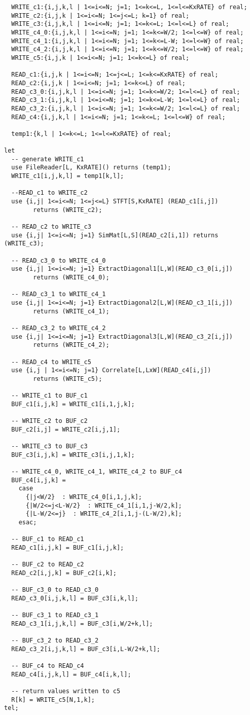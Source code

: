 \begin{verbatim}
  WRITE_c1:{i,j,k,l | 1<=i<=N; j=1; 1<=k<=L, 1<=l<=KxRATE} of real;
  WRITE_c2:{i,j,k | 1<=i<=N; 1<=j<=L; k=1} of real;
  WRITE_c3:{i,j,k,l | 1<=i<=N; j=1; 1<=k<=L; 1<=l<=L} of real;
  WRITE_c4_0:{i,j,k,l | 1<=i<=N; j=1; 1<=k<=W/2; 1<=l<=W} of real;
  WRITE_c4_1:{i,j,k,l | 1<=i<=N; j=1; 1<=k<=L-W; 1<=l<=W} of real;
  WRITE_c4_2:{i,j,k,l | 1<=i<=N; j=1; 1<=k<=W/2; 1<=l<=W} of real;
  WRITE_c5:{i,j,k | 1<=i<=N; j=1; 1<=k<=L} of real;

  READ_c1:{i,j,k | 1<=i<=N; 1<=j<=L; 1<=k<=KxRATE} of real;
  READ_c2:{i,j,k | 1<=i<=N; j=1; 1<=k<=L} of real;
  READ_c3_0:{i,j,k,l | 1<=i<=N; j=1; 1<=k<=W/2; 1<=l<=L} of real;
  READ_c3_1:{i,j,k,l | 1<=i<=N; j=1; 1<=k<=L-W; 1<=l<=L} of real;
  READ_c3_2:{i,j,k,l | 1<=i<=N; j=1; 1<=k<=W/2; 1<=l<=L} of real;
  READ_c4:{i,j,k,l | 1<=i<=N; j=1; 1<=k<=L; 1<=l<=W} of real;

  temp1:{k,l | 1<=k<=L; 1<=l<=KxRATE} of real;

let
  -- generate WRITE_c1
  use FileReader[L, KxRATE]() returns (temp1);
  WRITE_c1[i,j,k,l] = temp1[k,l];

  --READ_c1 to WRITE_c2
  use {i,j| 1<=i<=N; 1<=j<=L} STFT[S,KxRATE] (READ_c1[i,j]) 
        returns (WRITE_c2);

  -- READ_c2 to WRITE_c3
  use {i,j| 1<=i<=N; j=1} SimMat[L,S](READ_c2[i,1]) returns (WRITE_c3);

  -- READ_c3_0 to WRITE_c4_0
  use {i,j| 1<=i<=N; j=1} ExtractDiagonal1[L,W](READ_c3_0[i,j]) 
        returns (WRITE_c4_0);

  -- READ_c3_1 to WRITE_c4_1
  use {i,j| 1<=i<=N; j=1} ExtractDiagonal2[L,W](READ_c3_1[i,j]) 
        returns (WRITE_c4_1);

  -- READ_c3_2 to WRITE_c4_2
  use {i,j| 1<=i<=N; j=1} ExtractDiagonal3[L,W](READ_c3_2[i,j]) 
        returns (WRITE_c4_2);

  -- READ_c4 to WRITE_c5
  use {i,j | 1<=i<=N; j=1} Correlate[L,LxW](READ_c4[i,j]) 
        returns (WRITE_c5);

  -- WRITE_c1 to BUF_c1
  BUF_c1[i,j,k] = WRITE_c1[i,1,j,k];

  -- WRITE_c2 to BUF_c2
  BUF_c2[i,j] = WRITE_c2[i,j,1];

  -- WRITE_c3 to BUF_c3
  BUF_c3[i,j,k] = WRITE_c3[i,j,1,k];

  -- WRITE_c4_0, WRITE_c4_1, WRITE_c4_2 to BUF_c4
  BUF_c4[i,j,k] =
    case
      {|j<W/2}  : WRITE_c4_0[i,1,j,k];
      {|W/2<=j<L-W/2}  : WRITE_c4_1[i,1,j-W/2,k];
      {|L-W/2<=j}  : WRITE_c4_2[i,1,j-(L-W/2),k];
    esac;

  -- BUF_c1 to READ_c1
  READ_c1[i,j,k] = BUF_c1[i,j,k];

  -- BUF_c2 to READ_c2
  READ_c2[i,j,k] = BUF_c2[i,k];

  -- BUF_c3_0 to READ_c3_0
  READ_c3_0[i,j,k,l] = BUF_c3[i,k,l];

  -- BUF_c3_1 to READ_c3_1
  READ_c3_1[i,j,k,l] = BUF_c3[i,W/2+k,l];

  -- BUF_c3_2 to READ_c3_2
  READ_c3_2[i,j,k,l] = BUF_c3[i,L-W/2+k,l];

  -- BUF_c4 to READ_c4
  READ_c4[i,j,k,l] = BUF_c4[i,k,l];

  -- return values written to c5
  R[k] = WRITE_c5[N,1,k];
tel;
\end{verbatim}
